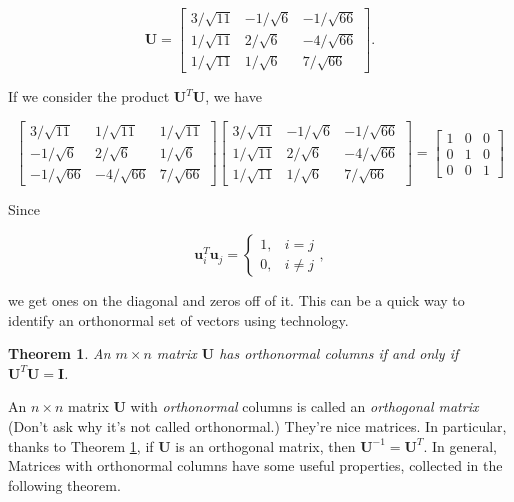 \documentclass[
]{book}
\newtheorem{theorem}{Theorem}[chapter]
\theoremstyle{definition}
\theoremstyle{definition}
\theoremstyle{definition}
\theoremstyle{definition}
\theoremstyle{remark}
\begin{document}
\[\mathbf{U}=\begin{bmatrix} 3/\sqrt{11} & -1/\sqrt{6} & -1/\sqrt{66}\\1/\sqrt{11} & 2/\sqrt{6} & -4/\sqrt{66}\\1/\sqrt{11}&1/\sqrt{6}&7/\sqrt{66}\end{bmatrix}.\]

If we consider the product \(\mathbf{U}^T\mathbf{U}\), we have

\[\begin{bmatrix}3/\sqrt{11} & 1/\sqrt{11} & 1/\sqrt{11}\\
 -1/\sqrt{6} & 2/\sqrt{6} & 1/\sqrt{6}\\-1/\sqrt{66} & -4/\sqrt{66} & 7/\sqrt{66}\end{bmatrix}\begin{bmatrix} 3/\sqrt{11} & -1/\sqrt{6} & -1/\sqrt{66}\\1/\sqrt{11} & 2/\sqrt{6} & -4/\sqrt{66}\\1/\sqrt{11}&1/\sqrt{6}&7/\sqrt{66}\end{bmatrix}=\begin{bmatrix}1 & 0 & 0\\0 & 1 &0\\0 & 0 & 1\end{bmatrix}\]

Since

\[\mathbf{u}_i^T\mathbf{u}_j=\begin{cases} 1, & i=j\\0, & i\neq j\end{cases},\]

we get ones on the diagonal and zeros off of it. This can be a quick way to identify an orthonormal set of vectors using technology.

\begin{theorembox}

\begin{theorem}
\protect\hypertarget{thm:OM}{}\label{thm:OM}An \(m\times n\) matrix \(\mathbf{U}\) has orthonormal columns if and only if \(\mathbf{U}^T\mathbf{U}=\mathbf{I}\).
\end{theorem}

\end{theorembox}

An \(n\times n\) matrix \(\mathbf{U}\) with \emph{orthonormal} columns is called an \emph{orthogonal matrix} (Don't ask why it's not called orthonormal.) They're nice matrices. In particular, thanks to Theorem \ref{thm:OM}, if \(\mathbf{U}\) is an orthogonal matrix, then \(\mathbf{U}^{-1}=\mathbf{U}^T.\) In general, Matrices with orthonormal columns have some useful properties, collected in the following theorem.
\end{document}
